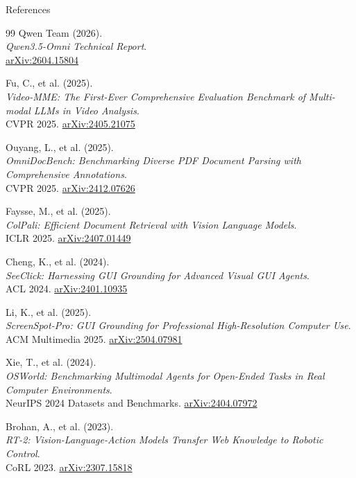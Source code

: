 \begin{frame}[allowframebreaks]{References}
\begin{thebibliography}{99}
      Qwen Team (2026). \\
      \emph{Qwen3.5-Omni Technical Report}.\\
      \href{https://arxiv.org/abs/2604.15804}{arXiv:2604.15804}

      Fu, C., et al. (2025). \\
      \emph{Video-MME: The First-Ever Comprehensive Evaluation Benchmark of Multi-modal LLMs in Video Analysis}.\\
      CVPR 2025. \href{https://arxiv.org/abs/2405.21075}{arXiv:2405.21075}

      Ouyang, L., et al. (2025). \\
      \emph{OmniDocBench: Benchmarking Diverse PDF Document Parsing with Comprehensive Annotations}.\\
      CVPR 2025. \href{https://arxiv.org/abs/2412.07626}{arXiv:2412.07626}

      Faysse, M., et al. (2025). \\
      \emph{ColPali: Efficient Document Retrieval with Vision Language Models}.\\
      ICLR 2025. \href{https://arxiv.org/abs/2407.01449}{arXiv:2407.01449}

      Cheng, K., et al. (2024). \\
      \emph{SeeClick: Harnessing GUI Grounding for Advanced Visual GUI Agents}.\\
      ACL 2024. \href{https://arxiv.org/abs/2401.10935}{arXiv:2401.10935}

      Li, K., et al. (2025). \\
      \emph{ScreenSpot-Pro: GUI Grounding for Professional High-Resolution Computer Use}.\\
      ACM Multimedia 2025. \href{https://arxiv.org/abs/2504.07981}{arXiv:2504.07981}

      Xie, T., et al. (2024). \\
      \emph{OSWorld: Benchmarking Multimodal Agents for Open-Ended Tasks in Real Computer Environments}.\\
      NeurIPS 2024 Datasets and Benchmarks. \href{https://arxiv.org/abs/2404.07972}{arXiv:2404.07972}

      Brohan, A., et al. (2023). \\
      \emph{RT-2: Vision-Language-Action Models Transfer Web Knowledge to Robotic Control}.\\
      CoRL 2023. \href{https://arxiv.org/abs/2307.15818}{arXiv:2307.15818}


\end{thebibliography}
\end{frame}
